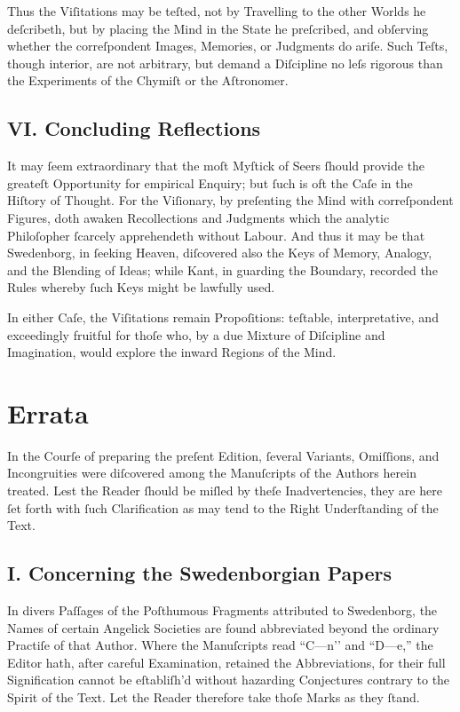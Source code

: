 \documentclass[12pt]{article}
\begin{document}
Thus the Viſitations may be teſted, not by Travelling to the other 
Worlds he deſcribeth, but by placing the Mind in the State he 
preſcribed, and obſerving whether the correſpondent Images, 
Memories, or Judgments do ariſe. Such Teſts, though interior, are 
not arbitrary, but demand a Diſcipline no leſs rigorous than the 
Experiments of the Chymiſt or the Aſtronomer.

\subsection*{VI. Concluding Reflections}
It may ſeem extraordinary that the moſt Myſtick of Seers ſhould 
provide the greateſt Opportunity for empirical Enquiry; but ſuch is 
oft the Caſe in the Hiſtory of Thought. For the Viſionary, by 
preſenting the Mind with correſpondent Figures, doth awaken 
Recollections and Judgments which the analytic Philoſopher 
ſcarcely apprehendeth without Labour. And thus it may be that 
Swedenborg, in ſeeking Heaven, diſcovered also the Keys of Memory, 
Analogy, and the Blending of Ideas; while Kant, in guarding the 
Boundary, recorded the Rules whereby ſuch Keys might be lawfully 
used.

In either Caſe, the Viſitations remain Propoſitions: teſtable, 
interpretative, and exceedingly fruitful for thoſe who, by a due 
Mixture of Diſcipline and Imagination, would explore the inward 
Regions of the Mind.

\newpage

\section*{Errata}

In the Courſe of preparing the preſent Edition, ſeveral Variants, 
Omiſſions, and Incongruities were diſcovered among the Manuſcripts of the 
Authors herein treated. Lest the Reader ſhould be miſled by theſe 
Inadvertencies, they are here ſet forth with ſuch Clarification as may tend 
to the Right Underſtanding of the Text.

\subsection*{I. Concerning the Swedenborgian Papers}
In divers Paſſages of the Poſthumous Fragments attributed to Swedenborg, the 
Names of certain Angelick Societies are found abbreviated beyond the 
ordinary Practiſe of that Author. Where the Manuſcripts read ``C—n’’ and 
``D—e,'' the Editor hath, after careful Examination, retained the 
Abbreviations, for their full Signification cannot be eſtabliſh’d without 
hazarding Conjectures contrary to the Spirit of the Text. Let the Reader 
therefore take thoſe Marks as they ſtand.
\end{document}
